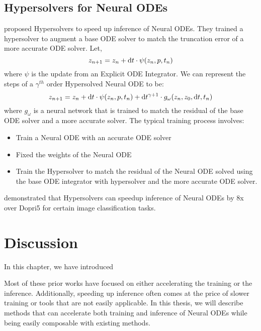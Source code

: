 \subsection{Hypersolvers for Neural ODEs}
\label{subsec:hypersolvers_for_neural_odes}

\citet{poli2020hypersolvers} proposed Hypersolvers to speed up inference of Neural ODEs. They trained a hypersolver to augment a base ODE solver to match the truncation error of a more accurate ODE solver. Let,
%
\begin{equation}
  z_{n + 1} = z_n + \mathrm{d}t \cdot \psi(z_n, p, t_n)
\end{equation}
%
where $\psi$ is the update from an Explicit ODE Integrator. We can represent the steps of a $\gamma^{th}$ order Hypersolved Neural ODE to be:
%
\begin{equation}
  z_{n + 1} = z_n + \mathrm{d}t \cdot \psi(z_n, p, t_n) + \mathrm{d}t^{\gamma + 1} \cdot g_\omega(z_n, z_0, \mathrm{d}t, t_n)
\end{equation}
%
where $g_\omega$ is a neural network that is trained to match the residual of the base ODE solver and a more accurate solver. The typical training process involves:
%
\begin{itemize}
  \item Train a Neural ODE with an accurate ODE solver
  \item Fixed the weights of the Neural ODE
  \item Train the Hypersolver to match the residual of the Neural ODE solved using the base ODE integrator with hypersolver and the more accurate ODE solver.
\end{itemize}
%
\citet{poli2020hypersolvers} demonstrated that Hypersolvers can speedup inference of Neural ODEs by 8x over Dopri5 for certain image classification tasks.

\section{Discussion}
\label{sec:discussion_neural_ode}

In this chapter, we have introduced 

Most of these prior works have focused on either accelerating the training or the inference. Additionally, speeding up inference often comes at the price of slower training or tools that are not easily applicable. In this thesis, we will describe methods that can accelerate both training and inference of Neural ODEs while being easily composable with existing methods.
